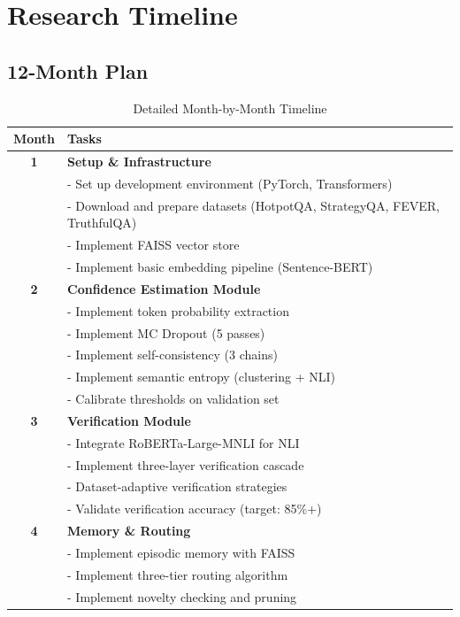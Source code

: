 \documentclass[12pt,a4paper]{article}
\theoremstyle{definition}
\begin{document}
\newpage

\section{Research Timeline}

\subsection{12-Month Plan}

\begin{table}[htbp]
\centering
\caption{Detailed Month-by-Month Timeline}
\small
\begin{tabular}{cp{9cm}}
\toprule
\textbf{Month} & \textbf{Tasks} \\
\midrule
\textbf{1} & \textbf{Setup \& Infrastructure} \\
& - Set up development environment (PyTorch, Transformers) \\
& - Download and prepare datasets (HotpotQA, StrategyQA, FEVER, TruthfulQA) \\
& - Implement FAISS vector store \\
& - Implement basic embedding pipeline (Sentence-BERT) \\
\midrule
\textbf{2} & \textbf{Confidence Estimation Module} \\
& - Implement token probability extraction \\
& - Implement MC Dropout (5 passes) \\
& - Implement self-consistency (3 chains) \\
& - Implement semantic entropy (clustering + NLI) \\
& - Calibrate thresholds on validation set \\
\midrule
\textbf{3} & \textbf{Verification Module} \\
& - Integrate RoBERTa-Large-MNLI for NLI \\
& - Implement three-layer verification cascade \\
& - Dataset-adaptive verification strategies \\
& - Validate verification accuracy (target: 85\%+) \\
\midrule
\textbf{4} & \textbf{Memory \& Routing} \\
& - Implement episodic memory with FAISS \\
& - Implement three-tier routing algorithm \\
& - Implement novelty checking and pruning \\

\end{tabular}
\end{table}
\end{document}
